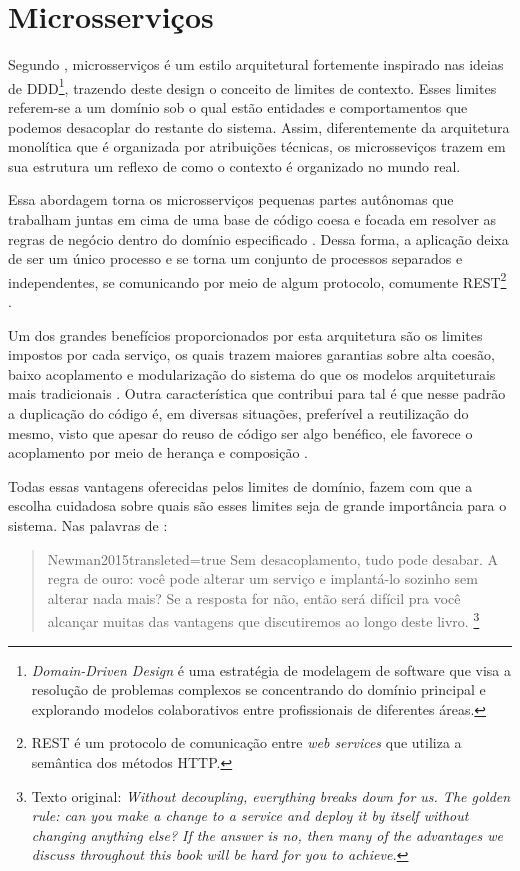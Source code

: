 \section{Microsserviços}

Segundo , microsserviços é um estilo
arquitetural fortemente inspirado nas ideias de \gls{DDD}\footnote{\textit{Domain-Driven Design} é
uma estratégia de modelagem de software que visa a resolução de problemas complexos se concentrando
do domínio principal e explorando modelos colaborativos entre profissionais de diferentes áreas.},
trazendo deste design o conceito de limites de contexto. Esses limites referem-se a um domínio sob
o qual estão entidades e comportamentos que podemos desacoplar do restante do sistema. Assim,
diferentemente da arquitetura monolítica que é organizada por atribuições técnicas, os microsseviços
trazem em sua estrutura um reflexo de como o contexto é organizado no mundo real.

Essa abordagem torna os microsserviços pequenas partes autônomas que trabalham juntas em cima de uma
base de código coesa e focada em resolver as regras de negócio dentro do domínio especificado
\cite{Newman2015}. Dessa forma, a aplicação deixa de ser um único processo e se torna um conjunto
de processos separados e independentes, se comunicando por meio de algum protocolo, comumente
\gls{REST}\footnote{\gls{REST} é um protocolo de comunicação entre \textit{web services} que utiliza
a semântica dos métodos HTTP.} \cite{MartinFowler:Microservices}.

Um dos grandes benefícios proporcionados por esta arquitetura são os limites impostos por cada
serviço, os quais trazem maiores garantias sobre alta coesão, baixo acoplamento e modularização do
sistema do que os modelos arquiteturais mais tradicionais \cite{MartinFowler:MicroserviceTradeOffs}.
Outra característica que contribui para tal é que nesse padrão a duplicação do código é, em diversas
situações, preferível a reutilização do mesmo, visto que apesar do reuso de código ser algo
benéfico, ele favorece o acoplamento por meio de herança e composição
\cite{Richards2020:FundamentalsOfSoftwareArchitecture}.

Todas essas vantagens oferecidas pelos limites de domínio, fazem com que a
escolha cuidadosa sobre quais são esses limites seja de grande importância para o sistema. Nas
palavras de :

\begin{quotation}{Newman2015}{transleted=true}
    Sem desacoplamento, tudo pode desabar. A regra de ouro: você pode alterar um serviço e
    implantá-lo sozinho sem alterar nada mais? Se a resposta for não, então será difícil pra você
    alcançar muitas das vantagens que discutiremos ao longo deste livro.  \footnote{Texto original:
    \textit{Without decoupling, everything breaks down for us. The golden
    rule: can you make a change to a service and deploy it by itself without changing anything else?
    If the answer is no, then many of the advantages we discuss throughout this book will be hard for
    you to achieve. }}
\end{quotation}


